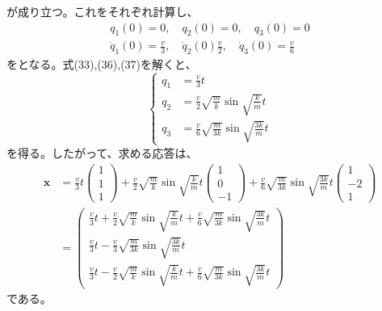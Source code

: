 \documentclass[a4paper]{jsarticle}
\begin{document}
が成り立つ。これをそれぞれ計算し、
\begin{align}
  q_1(0) = 0, \quad q_2(0) = 0, \quad q_3(0) = 0 \\
  \dot{q}_1(0) = \frac{v}{3}, \quad \dot{q}_2(0) \frac{v}{2}, \quad \dot{q}_3(0) = \frac{v}{6}
\end{align}
をとなる。式(33),(36),(37)を解くと、
\begin{equation}
  \begin{cases}
    q_1 &= \frac{v}{3} t \\
    q_2 &= \frac{v}{2} \sqrt{\frac{m}{k}} \sin \sqrt{\frac{k}{m}} t \\
    q_3 &= \frac{v}{6} \sqrt{\frac{m}{3k}} \sin \sqrt{\frac{3k}{m}} t
  \end{cases}
\end{equation}
を得る。したがって、求める応答は、
\begin{equation}
  \begin{aligned}
    \boldsymbol{x} &= \frac{v}{3} t
    \begin{pmatrix}
      1 \\ 1 \\ 1
    \end{pmatrix} +
    \frac{v}{2} \sqrt{\frac{m}{k}} \sin \sqrt{\frac{k}{m}} t
    \begin{pmatrix}
      1 \\ 0 \\ -1
    \end{pmatrix} +
    \frac{v}{6} \sqrt{\frac{m}{3k}} \sin \sqrt{\frac{3k}{m}} t
    \begin{pmatrix}
      1 \\ -2 \\ 1
    \end{pmatrix} \\
    &=
    \begin{pmatrix}
      \frac{v}{3} t +
      \frac{v}{2} \sqrt{\frac{m}{k}} \sin \sqrt{\frac{k}{m}} t +
      \frac{v}{6} \sqrt{\frac{m}{3k}} \sin \sqrt{\frac{3k}{m}} t \\
      \frac{v}{3} t -
      \frac{v}{3} \sqrt{\frac{m}{3k}} \sin \sqrt{\frac{3k}{m}} t \\
      \frac{v}{3} t -
      \frac{v}{2} \sqrt{\frac{m}{k}} \sin \sqrt{\frac{k}{m}} t +
      \frac{v}{6} \sqrt{\frac{m}{3k}} \sin \sqrt{\frac{3k}{m}} t
    \end{pmatrix}
  \end{aligned}
\end{equation}
である。
\end{document}
